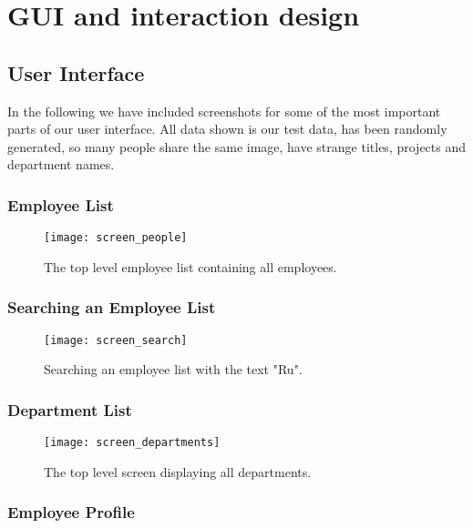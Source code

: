 \section{GUI and interaction design}

\subsection{User Interface}
\label{sec:gui_ui}

In the following we have included screenshots for some of the most
important parts of our user interface. All data shown is our test
data, has been randomly generated, so many people share the same
image, have strange titles, projects and department names.

\subsubsection{Employee List}

\begin{figure}[H]
    \centerline{ \texttt{[image: screen\_people]} }
    \caption{The top level employee list containing all employees.}
    \label{fig:screen_people}
\end{figure}

\subsubsection{Searching an Employee List}

\begin{figure}[H]
    \centerline{ \texttt{[image: screen\_search]} }
    \caption{Searching an employee list with the text "Ru".}
    \label{fig:screen_search}
\end{figure}

\subsubsection{Department List}

\begin{figure}[H]
    \centerline{ \texttt{[image: screen\_departments]} }
    \caption{The top level screen displaying all departments.}
    \label{fig:screen_departments}
\end{figure}

\subsubsection{Employee Profile}

